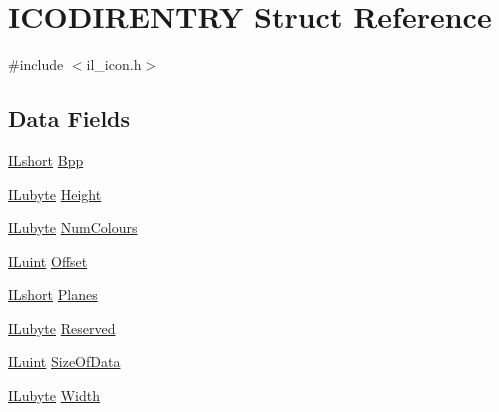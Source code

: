 \hypertarget{struct_i_c_o_d_i_r_e_n_t_r_y}{\section{I\-C\-O\-D\-I\-R\-E\-N\-T\-R\-Y Struct Reference}
\label{struct_i_c_o_d_i_r_e_n_t_r_y}
}


{\ttfamily \#include $<$il\-\_\-icon.\-h$>$}

\subsection*{Data Fields}
\begin{DoxyCompactItemize}
\item 
\hyperlink{il_8h_afc75ded918970afe7517d3f7f0561db3}{I\-Lshort} \hyperlink{struct_i_c_o_d_i_r_e_n_t_r_y_a5a417507894f560f6c8b0cb9c84001f6}{Bpp}
\item 
\hyperlink{il_8h_a8d2f04500100a86d1b00e98ab1b15a33}{I\-Lubyte} \hyperlink{struct_i_c_o_d_i_r_e_n_t_r_y_a9227558e28d9877e055f566ecba53f7a}{Height}
\item 
\hyperlink{il_8h_a8d2f04500100a86d1b00e98ab1b15a33}{I\-Lubyte} \hyperlink{struct_i_c_o_d_i_r_e_n_t_r_y_a54f32dd739cdfcf67e28d74c8944500b}{Num\-Colours}
\item 
\hyperlink{il_8h_ac6508d0e9c19e32f32e00d54b5b8cf30}{I\-Luint} \hyperlink{struct_i_c_o_d_i_r_e_n_t_r_y_a3b5617e246c8182c704c5369dec7f049}{Offset}
\item 
\hyperlink{il_8h_afc75ded918970afe7517d3f7f0561db3}{I\-Lshort} \hyperlink{struct_i_c_o_d_i_r_e_n_t_r_y_ad6a16792bdb04dba10e5a46eb518ce65}{Planes}
\item 
\hyperlink{il_8h_a8d2f04500100a86d1b00e98ab1b15a33}{I\-Lubyte} \hyperlink{struct_i_c_o_d_i_r_e_n_t_r_y_a3a223f4e29c105a474ef8164923f1673}{Reserved}
\item 
\hyperlink{il_8h_ac6508d0e9c19e32f32e00d54b5b8cf30}{I\-Luint} \hyperlink{struct_i_c_o_d_i_r_e_n_t_r_y_ad3bfe4c8a6696b42835730f7b70327b7}{Size\-Of\-Data}
\item 
\hyperlink{il_8h_a8d2f04500100a86d1b00e98ab1b15a33}{I\-Lubyte} \hyperlink{struct_i_c_o_d_i_r_e_n_t_r_y_a46d103db6e8ada59d4b61b4dc219cc57}{Width}
\end{DoxyCompactItemize}


